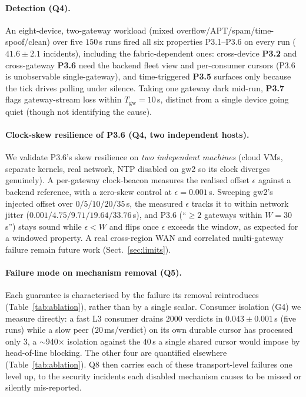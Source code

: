 \documentclass[runningheads]{llncs}
\begin{document}
\paragraph{Detection (Q4).}
An eight-device, two-gateway workload (mixed overflow/APT/spam/time-spoof/clean) over
five $150$\,s runs fired all six properties P3.1--P3.6 on every run ($41.6\pm2.1$
incidents), including the fabric-dependent ones: cross-device \textbf{P3.2} and
cross-gateway \textbf{P3.6} need the backend fleet view and per-consumer cursors (P3.6 is
unobservable single-gateway), and time-triggered \textbf{P3.5} surfaces only because the
tick drives polling under silence. Taking one gateway dark mid-run, \textbf{P3.7} flags
gateway-stream loss within $T_{\mathrm{gw}}{=}10$\,s, distinct from a single device going
quiet (though not identifying the cause).

\paragraph{Clock-skew resilience of P3.6 (Q4, two independent hosts).}
We validate P3.6's skew resilience on \emph{two independent machines} (cloud VMs, separate
kernels, real network, NTP disabled on gw2 so its clock diverges genuinely). A per-gateway
clock-beacon measures the realised offset $\epsilon$ against a backend reference, with a
zero-skew control at $\epsilon{=}0.001$\,s. Sweeping gw2's injected offset over
$0/5/10/20/35$\,s, the measured $\epsilon$ tracks it to within network jitter
($0.001/4.75/9.71/19.64/33.76$\,s), and P3.6 (``$\geq2$ gateways within $W{=}30$\,s'')
stays sound while $\epsilon<W$ and flips once $\epsilon$ exceeds the window, as expected
for a windowed property. A real cross-region WAN and correlated multi-gateway failure
remain future work (Sect.~\ref{sec:limits}).

\paragraph{Failure mode on mechanism removal (Q5).}
Each guarantee is characterised by the failure its removal reintroduces
(Table~\ref{tab:ablation}), rather than by a single scalar. Consumer isolation (G4) we
measure directly: a fast L3 consumer drains $2000$ verdicts in $0.043\pm0.001$\,s (five
runs) while a slow peer ($20$\,ms/verdict) on its own durable cursor has processed only
$3$, a $\sim$940$\times$ isolation against the $40$\,s a single shared cursor would
impose by head-of-line blocking. The other four are quantified elsewhere (Table~\ref{tab:ablation}). Q8 then carries each
of these transport-level failures one level up, to the security incidents each disabled
mechanism causes to be missed or silently mis-reported.
\end{document}
